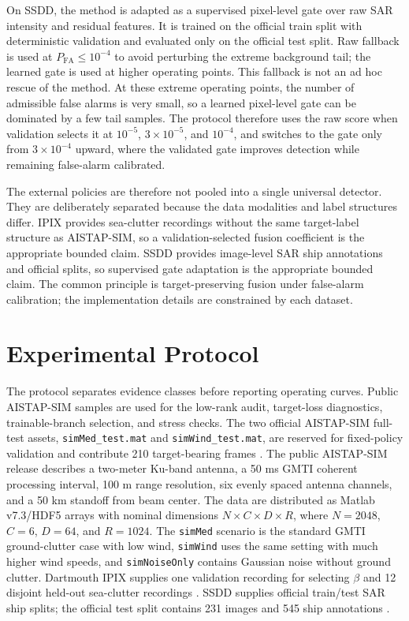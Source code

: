 \documentclass[journal]{IEEEtran}
\begin{document}
On SSDD, the method is adapted as a supervised pixel-level gate over raw SAR intensity and residual features. It is trained on the official train split with deterministic validation and evaluated only on the official test split. Raw fallback is used at $P_{\mathrm{FA}} \leq 10^{-4}$ to avoid perturbing the extreme background tail; the learned gate is used at higher operating points. This fallback is not an ad hoc rescue of the method. At these extreme operating points, the number of admissible false alarms is very small, so a learned pixel-level gate can be dominated by a few tail samples. The protocol therefore uses the raw score when validation selects it at $10^{-5}$, $3\times10^{-5}$, and $10^{-4}$, and switches to the gate only from $3\times10^{-4}$ upward, where the validated gate improves detection while remaining false-alarm calibrated.

The external policies are therefore not pooled into a single universal detector. They are deliberately separated because the data modalities and label structures differ. IPIX provides sea-clutter recordings without the same target-label structure as AISTAP-SIM, so a validation-selected fusion coefficient is the appropriate bounded claim. SSDD provides image-level SAR ship annotations and official splits, so supervised gate adaptation is the appropriate bounded claim. The common principle is target-preserving fusion under false-alarm calibration; the implementation details are constrained by each dataset.

\section{Experimental Protocol}

The protocol separates evidence classes before reporting operating curves. Public AISTAP-SIM samples are used for the low-rank audit, target-loss diagnostics, trainable-branch selection, and stress checks. The two official AISTAP-SIM full-test assets, \texttt{simMed\_test.mat} and \texttt{simWind\_test.mat}, are reserved for fixed-policy validation and contribute 210 target-bearing frames \cite{vega2024aistap}. The public AISTAP-SIM release describes a two-meter Ku-band antenna, a 50 ms GMTI coherent processing interval, 100 m range resolution, six evenly spaced antenna channels, and a 50 km standoff from beam center. The data are distributed as Matlab v7.3/HDF5 arrays with nominal dimensions $N\times C\times D\times R$, where $N=2048$, $C=6$, $D=64$, and $R=1024$. The \texttt{simMed} scenario is the standard GMTI ground-clutter case with low wind, \texttt{simWind} uses the same setting with much higher wind speeds, and \texttt{simNoiseOnly} contains Gaussian noise without ground clutter. Dartmouth IPIX supplies one validation recording for selecting $\beta$ and 12 disjoint held-out sea-clutter recordings \cite{haykin2002seaclutter,dewind2010database}. SSDD supplies official train/test SAR ship splits; the official test split contains 231 images and 545 ship annotations \cite{wang2019ssdd,zhang2021ssdd}.
\end{document}
